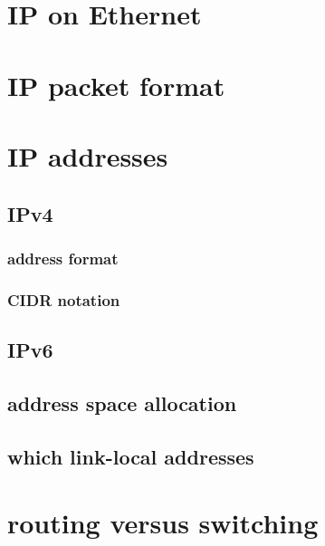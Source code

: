 \section{IP on Ethernet}


\section{IP packet format}


\section{IP addresses}

\subsection{IPv4}
\subsubsection{address format}


\subsubsection{CIDR notation}


\subsection{IPv6}


\subsection{address space allocation}


\subsection{which link-local addresses}



\section{routing versus switching}





